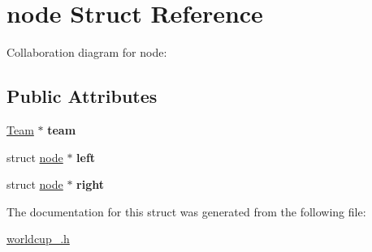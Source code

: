 \hypertarget{structnode}{}\section{node Struct Reference}
\label{structnode}


Collaboration diagram for node\+:
\subsection*{Public Attributes}
\begin{DoxyCompactItemize}
\item 
\hyperlink{structTeam}{Team} $\ast$ {\bfseries team}\hypertarget{structnode_a399d0f33f6d6d2156a948264c2d668be}{}\label{structnode_a399d0f33f6d6d2156a948264c2d668be}

\item 
struct \hyperlink{structnode}{node} $\ast$ {\bfseries left}\hypertarget{structnode_a3ce38490a651bfda86d88ff955e96abc}{}\label{structnode_a3ce38490a651bfda86d88ff955e96abc}

\item 
struct \hyperlink{structnode}{node} $\ast$ {\bfseries right}\hypertarget{structnode_a875f75abfe22103500535b179828e4e3}{}\label{structnode_a875f75abfe22103500535b179828e4e3}

\end{DoxyCompactItemize}


The documentation for this struct was generated from the following file\+:\begin{DoxyCompactItemize}
\item 
\hyperlink{worldcup__2018_8h}{worldcup\+\_.\+h}\end{DoxyCompactItemize}

